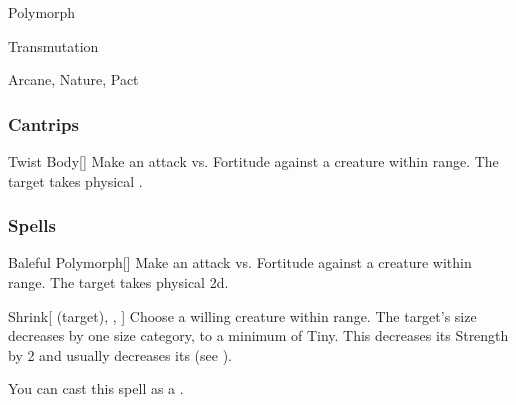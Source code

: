 \newpage
\begin{spellsection}{Polymorph}

\begin{spellheader}
\end{spellheader}


 Transmutation

 Arcane, Nature, Pact

\subsubsection{Cantrips}


\begin{freeability}{Twist Body}[]
Make an attack vs. Fortitude against a creature within \rngmed range.
\hit The target takes physical .
\end{freeability}

\end{spellsection}


\subsubsection{Spells}


\lowercase{\hypertarget{spell:Baleful Polymorph}{}}\label{spell:Baleful Polymorph}
\begin{apability}[\nth{1}]{\hypertarget{spell:Baleful Polymorph}{Baleful Polymorph}}[]
Make an attack vs. Fortitude against a creature within \rngmed range.
\hit The target takes physical  \plus2d.
\end{apability}
\vspace{0.25em}



\lowercase{\hypertarget{spell:Shrink}{}}\label{spell:Shrink}
\begin{attuneability}[\nth{1}]{\hypertarget{spell:Shrink}{Shrink}}[ (target), , ]
Choose a willing creature within \rngclose range.
The target's size decreases by one size category, to a minimum of Tiny.
This decreases its Strength by 2 and usually decreases its  (see ).

You can cast this spell as a .
\end{attuneability}
\vspace{0.25em}



